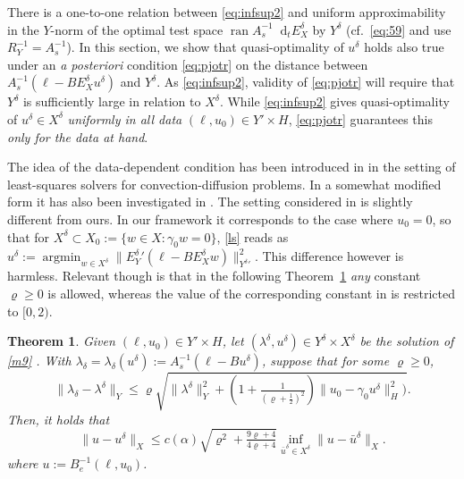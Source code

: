 \documentclass{amsart}
\newtheorem{theorem}{Theorem}[section]
\numberwithin{equation}{section}
\DeclareMathOperator{\ran}{ran}
\DeclareMathOperator*{\argmin}{argmin}
\newcommand{\1}{\mathbb 1}
\newcommand*\diff{\mathop{}\!\mathrm{d}}
\newcommand{\be}{\begin{equation}}
\newcommand{\ee}{\end{equation}}
\begin{document}
There is a one-to-one relation between \eqref{eq:infsup2} and uniform approximability in the $Y$-norm of the optimal test space $\ran A_s^{-1} \diff_t E_X^\delta$ by $Y^\delta$ (cf.~\eqref{eq:59} and use $R_Y^{-1}=A_s^{-1}$). In this section, we show that quasi-optimality of $u^\delta$ holds also true under 
an \emph{a posteriori} condition \eqref{eq:pjotr} on the distance between $A_s^{-1} (\ell-B E_X^\delta u^\delta)$ and $Y^\delta$. 
As \eqref{eq:infsup2}, validity of \eqref{eq:pjotr} will require that $Y^\delta$ is sufficiently large in relation to $X^\delta$. 
While \eqref{eq:infsup2} gives quasi-optimality of $u^\delta \in X^\delta$ \emph{uniformly in all data} $(\ell,u_0) \in Y' \times H$, \eqref{eq:pjotr} guarantees this \emph{only for the data at hand}.
\medskip

The idea of the data-dependent condition has been introduced in \cite{45.44} in the setting of least-squares solvers for convection-diffusion problems. In a somewhat modified form it has also been investigated in \cite{64.18}.
The setting considered in \cite{45.44} is slightly different from ours. In our framework it corresponds to the case where $u_0=0$, so that for
$X^\delta \subset X_0:=\{w \in X\colon \gamma_0 w=0\}$, \eqref{ls} reads as $u^\delta:=\argmin_{w \in X^\delta} \|{E_Y^\delta}'(\ell-B E_X^\delta w)\|_{{Y^\delta}'}^2$.
This difference however is harmless. Relevant though is that in the following Theorem~\ref{thm:pjotr} \emph{any} constant $\varrho\geq 0$ is allowed, whereas the value of the corresponding constant 
in \cite[Lemma 3.3]{45.44} is restricted to $[0,2)$.
  
 \begin{theorem} \label{thm:pjotr} Given $(\ell,u_0) \in Y' \times H$, let $(\lambda^\delta,u^\delta) \in Y^\delta \times X^\delta$ be the solution of \eqref{m9} . With $\lambda_\delta=\lambda_\delta(u^\delta):=A_s^{-1}(\ell-B  u^\delta)$, suppose that for some $\varrho \geq 0$,
 \be \label{eq:pjotr}
 \|\lambda_\delta- \lambda^\delta\|_Y \leq \varrho \sqrt{\| \lambda^\delta\|_Y^2+(1+\tfrac{1}{(\varrho+\frac12)^2}) \|u_0-\gamma_0 u^\delta\|_H^2)}.
 \ee
 Then, it holds that
  \be \label{eq:g12}
\|u- u^\delta\|_X \leq c(\alpha) \sqrt{\varrho^2+\tfrac{9 \varrho+4}{4 \varrho+4}} \inf_{\bar{u}^{\delta} \in X^\delta} \|u- \bar{u}^\delta\|_X.
 \ee
 where $u:=B_e^{-1}(\ell,u_0)$.
 \end{theorem}
 
\end{document}
